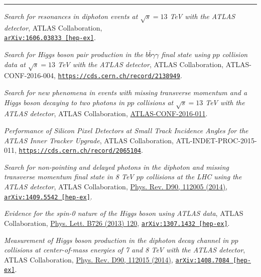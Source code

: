 \documentclass{letter}
\begin{document}
\begin{flushleft}
\Large{\textsc{\textbf{\color{Maroon}{Selected Publications}}}}
\hrule
\end{flushleft}

\textit{Search for resonances in diphoton events at $\sqrt{s}=13$ TeV with the ATLAS detector}, ATLAS Collaboration, \\
\href{http://arxiv.org/abs/1606.03833}{\texttt{arXiv:1606.03833 [hep-ex]}}.

\textit{Search for Higgs boson pair production in the $b \bar{b} \gamma \gamma$ final state using $pp$ collision data at $\sqrt{s}=13$ TeV with the ATLAS detector}, ATLAS Collaboration, ATLAS-CONF-2016-004, \href{https://cds.cern.ch/record/2138949}{\texttt{https://cds.cern.ch/record/2138949}}.

\textit{Search for new phenomena in events with missing transverse momentum and a Higgs boson decaying to two photons in $pp$ collisions at $\sqrt{s}=13$ TeV with the ATLAS detector}, ATLAS Collaboration,  \href{https://cds.cern.ch/record/2139812}{ATLAS-CONF-2016-011}.

\textit{Performance of Silicon Pixel Detectors at Small Track Incidence Angles for the ATLAS Inner Tracker Upgrade}, ATLAS Collaboration, ATL-INDET-PROC-2015-011, \href{https://cds.cern.ch/record/2065104}{\texttt{https://cds.cern.ch/record/2065104}}.

\textit{Search for non-pointing and delayed photons in the diphoton and missing transverse momentum final state in 8 TeV $pp$ collisions at the LHC using the ATLAS detector}, ATLAS Collaboration, 
\href{http://journals.aps.org/prd/abstract/10.1103/PhysRevD.90.112005}{Phys. Rev. D90, 112005 (2014)}, \href{https://arxiv.org/abs/1409.5542}{\texttt{arXiv:1409.5542 [hep-ex]}}.

\textit{Evidence for the spin-0 nature of the Higgs boson using ATLAS data}, ATLAS Collaboration, \href{http://www.sciencedirect.com/science/article/pii/S0370269313006527?np=y}{Phys. Lett. B726 (2013) 120}, \href{https://arxiv.org/abs/1307.1432}{\texttt{arXiv:1307.1432 [hep-ex]}}.

\textit{Measurement of Higgs boson production in the diphoton decay channel in $pp$ collisions at center-of-mass energies of 7 and 8 TeV with the ATLAS detector}, ATLAS Collaboration, \href{http://journals.aps.org/prd/abstract/10.1103/PhysRevD.90.112015}{Phys. Rev. D90, 112015 (2014)}, \href{http://arxiv.org/abs/1408.7084}{\texttt{arXiv:1408.7084 [hep-ex]}}.
\end{document}
